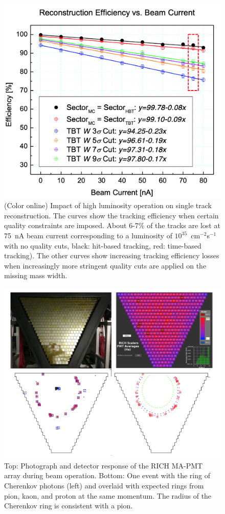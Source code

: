 \documentclass[final,3p,twocolumn]{elsarticle}
\begin{document}
\begin{figure}[htbp!]
\centerline{\includegraphics[width=1.0\columnwidth]{efficiencies.png}}
\caption{(Color online) Impact of high luminosity operation on single track reconstruction. The curves show the
tracking efficiency when certain quality constraints are imposed. About 6-7\% of the tracks are lost at 75~nA
beam current corresponding to a luminosity of $10^{35}$~cm$^{-2}$s$^{-1}$ with no quality cuts, black: hit-based
tracking, red: time-based tracking). The other curves show increasing tracking efficiency losses when increasingly
more stringent quality cuts are applied on the missing mass width.}
\label{efficiencies}
\end{figure}

\begin{figure}[htbp!]
\centerline{\includegraphics[width=1.0\columnwidth]{rich-event.png}}
\caption{Top: Photograph and detector response of the RICH MA-PMT array during beam operation. Bottom: One
event with the ring of Cherenkov photons (left) and overlaid with expected rings from pion, kaon, and proton at
the same momentum. The radius of the Cherenkov ring is consistent with a pion.}
\label{rich-event}
\end{figure}
\end{document}
